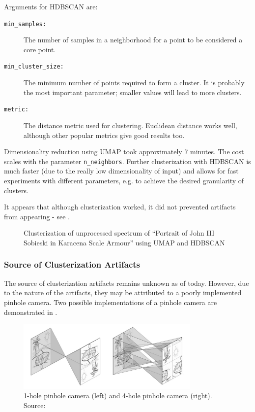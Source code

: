 Arguments for HDBSCAN are:
\begin{description}
    \item[\texttt{min\_samples:}] The number of samples in a neighborhood for a point to be considered a core point.
    \item[\texttt{min\_cluster\_size:}] The minimum number of points required to form a cluster. It is probably the most important parameter; smaller values will lead to more clusters.
    \item[\texttt{metric:}] The distance metric used for clustering. Euclidean distance works well, although other popular metrics give good results too.
\end{description}

Dimensionality reduction using UMAP took approximately 7 minutes. 
The cost scales with the parameter \texttt{n\_neighbors}.
Further clusterization with HDBSCAN is much faster (due to the really low dimensionality of input) and allows for fast experiments with different parameters, e.g. to achieve the desired granularity of clusters.

It appears that although clusterization worked, it did not prevented artifacts from appearing - see .
\begin{figure}[H] 
  \centering     
   
  \caption{Clusterization of unprocessed spectrum of ``Portrait of John III Sobieski in Karacena Scale Armour'' using UMAP and HDBSCAN}
  \label{fig:sobieski_clustered_hdbscan_noise}
\end{figure}

\newpage
\subsubsection{Source of Clusterization Artifacts}
The source of clusterization artifacts remains unknown as of today. 
However, due to the nature of the artifacts, they may be attributed to a poorly implemented pinhole camera.
Two possible implementations of a pinhole camera are demonstrated in .

\begin{figure}[H]
  \centering
  \includegraphics[width=0.8\textwidth]{img/pinhole_camera.png}
  \caption{1-hole pinhole camera (left) and 4-hole pinhole camera (right). Source: \cite{Lach2022}}
  \label{fig:pinhole-camera-implementations}
\end{figure}

